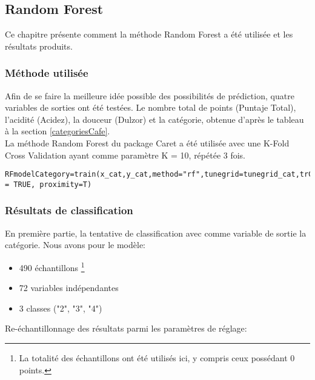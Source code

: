 \subsection{Random Forest}
Ce chapitre présente comment la méthode Random Forest a été utilisée et les résultats produits. 
\subsubsection{Méthode utilisée}
Afin de se faire la meilleure idée possible des possibilités de prédiction, quatre variables de sorties ont été testées. Le nombre total de points (Puntaje Total), l'acidité (Acidez), la douceur (Dulzor) et la catégorie, obtenue d'après le tableau à la section \ref{categoriesCafe}. \\

\noindent La méthode Random Forest du package Caret a été utilisée avec une K-Fold Cross Validation ayant comme paramètre K = 10, répétée 3 fois. 

\begin{lstlisting}[caption={Fonction d'entrainement et de test du modèle avec Random Forest},captionpos=b]
	RFmodelCategory=train(x_cat,y_cat,method="rf",tunegrid=tunegrid_cat,trControl=trainControl(method="repeatedcv",number=10,repeats=3),tuneLength=10,importance = TRUE, proximity=T)
\end{lstlisting}




\newpage
\subsubsection{Résultats de classification}
En première partie, la tentative de classification avec comme variable de sortie la catégorie. Nous avons pour le modèle:

\begin{itemize}
	\item 490 échantillons \footnote{La totalité des échantillons ont été utilisés ici, y compris ceux possédant 0 points.}
	\item 72 variables indépendantes
	\item 3 classes ("2", "3", "4")
\end{itemize}

Re-échantillonnage des résultats parmi les paramètres de réglage:

